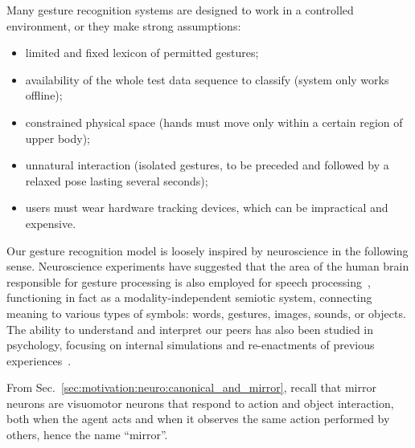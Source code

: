 Many gesture recognition systems are designed to work in a controlled environment, or they make strong assumptions:
\begin{itemize}
\item limited and fixed lexicon of permitted gestures;

\item availability of the whole test data sequence to classify (system only works offline);

\item constrained physical space (hands must move only within a certain region of upper body);

\item unnatural interaction (isolated gestures, to be preceded and followed by a relaxed pose lasting several seconds);

\item users must wear hardware tracking devices, which can be impractical and expensive.
\end{itemize}

Our gesture recognition model is loosely inspired by neuroscience in the following sense.
Neuroscience experiments have suggested that the area of the human brain responsible for gesture processing is also employed for speech processing~\cite{xu:2009:pnas}, functioning in fact as a modality-independent semiotic system, connecting meaning to various types of symbols: words, gestures, images, sounds, or objects.
The ability to understand and interpret our peers has also been studied in psychology, focusing on internal simulations and re-enactments of previous experiences~\cite{schillaci:2012:hbu,billing:2016:frobt}.

From Sec.~\ref{sec:motivation:neuro:canonical_and_mirror}, recall that mirror neurons are visuomotor neurons that respond to action and object interaction, both when the agent acts and when it observes the same action performed by others, hence the name ``mirror''.

